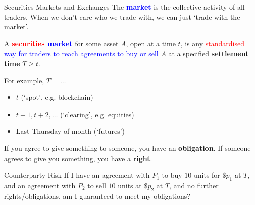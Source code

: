 \documentclass{beamer}
\begin{document}
\begin{frame}{Securities Markets and Exchanges}
	The \textbf{\textcolor{blue}{market}} is the collective activity of all traders. When we don't care who we trade with, we can just `trade with the market'.

	A \textbf{\textcolor{red}{securities} \textcolor{blue}{market}} for some asset $A$, open at a time $t$, is any \textcolor{red}{standardised} \textcolor{blue}{way for traders to reach agreements to buy or sell} $A$ at a specified \textbf{settlement time} $T\geq t$. %

	\pause

	For example, $T=\ldots$
	\begin{itemize}
		\item $t$ (`spot', e.g. blockchain) %
		\item $t+1, t+2, \ldots$ (`clearing', e.g. equities)
		\item Last Thursday of month (`futures')
	\end{itemize}

	\pause
	If you agree to give something to someone, you have an \textbf{obligation}. If someone agrees to give you something, you have a \textbf{right}.

	\begin{block}{Counterparty Risk}
		If I have an agreement with $P_1$ to buy $10$ units for $\$p_1$ at $T$, and an agreement with $P_2$ to sell $10$ units at $\$p_2$ at $T$, and no further rights/obligations, am I guaranteed to meet my obligations?
	\end{block}%
\end{frame}
\end{document}
